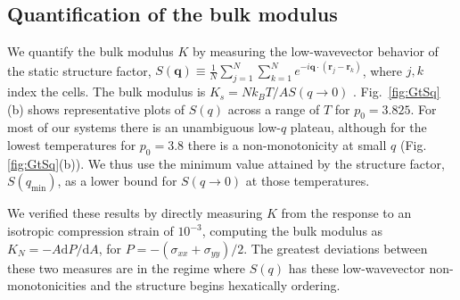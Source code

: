 \documentclass[aps,reprint,superscriptaddress,nofootinbib, notitlepage,prl]{revtex4-2}
\begin{document}
\subsection{Quantification of the bulk modulus}
We quantify the bulk modulus $K$ by measuring the low-wavevector behavior of the static structure factor, $S(\textbf{q}) \equiv \frac{1}{N}\sum_{j=1}^{N}\sum_{k=1}^{N} e^{- i\textbf{q}\cdot (\textbf{r}_j-\textbf{r}_k)}$, where $j,k$ index the cells.
The bulk modulus is $K_s=Nk_BT/AS(q\rightarrow 0)$ \cite{hansen2013theory,zhuravlyov2023finite}.
Fig.~\ref{fig:GtSq}(b) shows representative plots of $S(q)$ across a range of $T$ for $p_0=3.825$.
For most of our systems there is an unambiguous low-$q$ plateau, although for the lowest temperatures for $p_0=3.8$ there is a non-monotonicity at small $q$ (Fig. \ref{fig:GtSq}(b)).
We thus use the minimum value attained by the structure factor, $S(q_\mathrm{min})$, as a lower bound for $S(q\rightarrow 0)$ at those temperatures.

We verified these results by directly measuring $K$ from the response to an isotropic compression strain of $10^{-3}$, computing the bulk modulus as $K_N=-A \mathrm{d}P/\mathrm{d}A$, for $P=-(\sigma_{xx}+\sigma_{yy})/2$. The greatest deviations between these two measures are in the regime where $S(q)$ has these low-wavevector non-monotonicities and the structure begins hexatically ordering.
\end{document}
